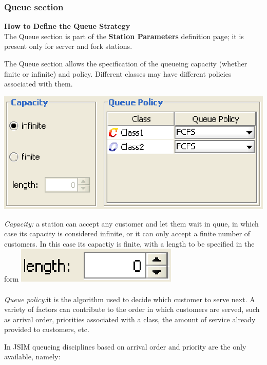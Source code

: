 \subsubsection{Queue section}
\label{sec:QueueSection}
\textbf{How to Define the Queue Strategy}\\
The Queue section is part of the \textbf{Station Parameters} definition page; it is present only for server and fork stations. 

The Queue section allows the specification of the queueing capacity (whether finite or infinite) and policy. Different classes may have different policies associated with them.
\begin{center}
\includegraphics[scale=.5]{img/jsim/queue_section1.eps}
\end{center}
\emph{Capacity:} a station can accept any customer and let them wait in quue, in which case its capacity is considered infinite, or it can only accept a finite number 
of customers. In this case its capactiy is finite, with a length to be specified in the form \includegraphics[scale=.5]{img/jsim/lenght.eps}\\\\
\emph{Queue policy:}it is the algorithm used to decide which customer to serve next. A variety of factors can contribute to the order in which customers are served, such as arrival order, priorities associated with a class, the amount of service already provided to customers, etc.

In JSIM queueing disciplines based on arrival order and priority are the only available, namely:

